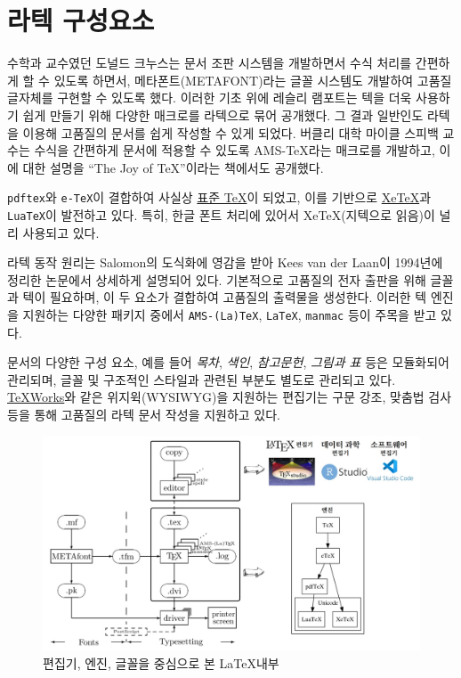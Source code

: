 \documentclass[
  letterpaper,
]{book}
\begin{document}
\hypertarget{latex-knuth}{%
\section{라텍 구성요소}\label{latex-knuth}}

수학과 교수였던 도널드 크누스는 문서 조판 시스템을 개발하면서 수식
처리를 간편하게 할 수 있도록 하면서, 메타폰트(METAFONT)라는 글꼴
시스템도 개발하여 고품질 글자체를 구현할 수 있도록 했다. 이러한 기초
위에 레슬리 램포트는 텍을 더욱 사용하기 쉽게 만들기 위해 다양한 매크로를
라텍으로 묶어 공개했다. 그 결과 일반인도 라텍을 이용해 고품질의 문서를
쉽게 작성할 수 있게 되었다. 버클리 대학 마이클 스피백 교수는 수식을
간편하게 문서에 적용할 수 있도록 AMS-TeX라는 매크로를 개발하고, 이에
대한 설명을 ``The Joy of TeX''이라는 책에서도 공개했다.
\autocite{spivak1990joy}

\texttt{pdftex}와 \texttt{e-TeX}이 결합하여 사실상
\href{http://wiki.ktug.org/wiki/wiki.php/TeX}{표준 TeX}이 되었고, 이를
기반으로 \href{http://wiki.ktug.org/wiki/wiki.php/XeTeX}{XeTeX}과
\texttt{LuaTeX}이 발전하고 있다. 특히, 한글 폰트 처리에 있어서
XeTeX(지텍으로 읽음)이 널리 사용되고 있다.

라텍 동작 원리는 Salomon의 도식화에 영감을 받아 Kees van der Laan이
1994년에 정리한 논문에서 상세하게 설명되어 있다. \autocite{van1994tex}
기본적으로 고품질의 전자 출판을 위해 글꼴과 텍이 필요하며, 이 두 요소가
결합하여 고품질의 출력물을 생성한다. 이러한 텍 엔진을 지원하는 다양한
패키지 중에서 \texttt{AMS-(La)TeX}, \texttt{LaTeX}, \texttt{manmac} 등이
주목을 받고 있다.

문서의 다양한 구성 요소, 예를 들어 \emph{목차}, \emph{색인},
\emph{참고문헌}, \emph{그림과 표} 등은 모듈화되어 관리되며, 글꼴 및
구조적인 스타일과 관련된 부분도 별도로 관리되고 있다.
\href{https://www.tug.org/texworks/}{TeXWorks}와 같은 위지윅(WYSIWYG)을
지원하는 편집기는 구문 강조, 맞춤법 검사 등을 통해 고품질의 라텍 문서
작성을 지원하고 있다.

\begin{figure}

{\centering \includegraphics{images/latex_under_the_hood.jpg}

}

\caption{편집기, 엔진, 글꼴을 중심으로 본 \LaTeX 내부}

\end{figure}
\end{document}
